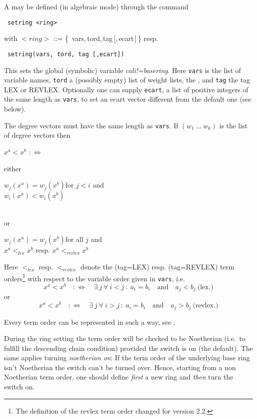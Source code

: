 A  may be defined (in algebraic mode) through the
command 
\begin{verbatim}
 setring <ring>
\end{verbatim}
with $<ring>$ ::= \{\, vars,\,tord,\,tag\,[,\,ecart\,]\,\} resp.
\begin{verbatim}
 setring(vars, tord, tag [,ecart])
\end{verbatim}
\index
This sets the global (symbolic) variable 
\emph{cali!=basering}. Here
\texttt{vars} is the list of variable names, \texttt{tord} a (possibly
empty) list of weight lists, the , and \texttt{tag}
the tag LEX or REVLEX. Optionally one can supply \texttt{ecart}, a list 
of positive integers of the same length as \texttt{vars}, to set an ecart
vector different from the default one (see below).

The degree vectors must have the same length as \texttt{vars}. If $(w_1\
\ldots\ w_k)$ is the list of degree vectors then
\begin{center}
$x^a<x^b$ \qquad $:\Leftrightarrow$ \qquad 
\parbox[t]{8cm}{either\hfill 
\parbox[t]{6cm}{$w_j(x^a)=w_j(x^b)$\hfill for $j<i$ \hfill and \\[8pt]
$w_i(x^a)<w_i(x^b)$} \\[10pt] or\hfill 
\parbox[t]{6cm}{$w_j(x^a)=w_j(x^b)$\hfill for all $j$ \hfill and \\[8pt]
$x^a<_{lex}x^b$ resp. $x^a<_{revlex}x^b$}}
\end{center}
Here $<_{lex}$ resp. $<_{revlex}$ denote the
 (tag=LEX) resp. 
(tag=REVLEX) term orders\footnote{The definition of the revlex term
order changed for version 2.2.}
with respect to the variable order given in \texttt{vars}, i.e.\ 
\[x^a<x^b \quad :\Leftrightarrow \quad 
\exists\ j\ \forall\ i<j\ :\ a_i=b_i\quad\mbox{and}\quad a_j<b_j\
\mbox{(lex.)}\]
or 
\[x^a<x^b \quad :\Leftrightarrow \quad 
\exists\ j\ \forall\ i>j\ :\ a_i=b_i\quad\mbox{and}\quad a_j>b_j\
\mbox{(revlex.)}\]

Every term order can be represented in such a way, see \cite{Mora:88}.

During the ring setting the term order will be checked to be
Noetherian (i.e.\ to fulfill the descending chain condition) provided
the switch \ttindexswitch[CALI]{Noetherian} is on (the default). The same applies
turning \emph{noetherian on}: If the term order of the underlying
base ring isn't Noetherian the switch can't be turned over. Hence,
starting from a non Noetherian term order, one should define {\em
first} a new ring and \emph{then} turn the switch on. 

